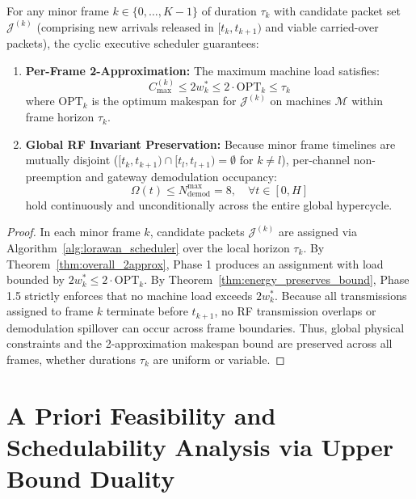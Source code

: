\documentclass{article}
\begin{document}
\begin{theorem}
\label{thm:cyclic_guarantee}
For any minor frame $k \in \{0, \dots, K-1\}$ of duration $\tau_k$ with candidate packet set $\mathcal{J}^{(k)}$ (comprising new arrivals released in $[t_k, t_{k+1})$ and viable carried-over packets), the cyclic executive scheduler guarantees:
\begin{enumerate}
    \item \textbf{Per-Frame 2-Approximation:} The maximum machine load satisfies:
    \begin{equation}
    C_{\max}^{(k)} \le 2 w_k^* \le 2 \cdot \text{OPT}_k \le \tau_k
    \end{equation}
    where $\text{OPT}_k$ is the optimum makespan for $\mathcal{J}^{(k)}$ on machines $\mathcal{M}$ within frame horizon $\tau_k$.
    \item \textbf{Global RF Invariant Preservation:} Because minor frame timelines are mutually disjoint ($[t_k, t_{k+1}) \cap [t_l, t_{l+1}) = \emptyset$ for $k \ne l$), per-channel non-preemption and gateway demodulation occupancy:
    \begin{equation}
    \Omega(t) \le N_{\text{demod}}^{\max} = 8, \quad \forall t \in [0, H]
    \end{equation}
    hold continuously and unconditionally across the entire global hypercycle.
\end{enumerate}
\end{theorem}

\begin{proof}
In each minor frame $k$, candidate packets $\mathcal{J}^{(k)}$ are assigned via Algorithm~\ref{alg:lorawan_scheduler} over the local horizon $\tau_k$. By Theorem~\ref{thm:overall_2approx}, Phase 1 produces an assignment with load bounded by $2 w_k^* \le 2 \cdot \text{OPT}_k$. By Theorem~\ref{thm:energy_preserves_bound}, Phase 1.5 strictly enforces that no machine load exceeds $2 w_k^*$. Because all transmissions assigned to frame $k$ terminate before $t_{k+1}$, no RF transmission overlaps or demodulation spillover can occur across frame boundaries. Thus, global physical constraints and the 2-approximation makespan bound are preserved across all frames, whether durations $\tau_k$ are uniform or variable.
\end{proof}

\section{A Priori Feasibility and Schedulability Analysis via Upper Bound Duality}
\label{sec:schedulability_certificate}
\end{document}
